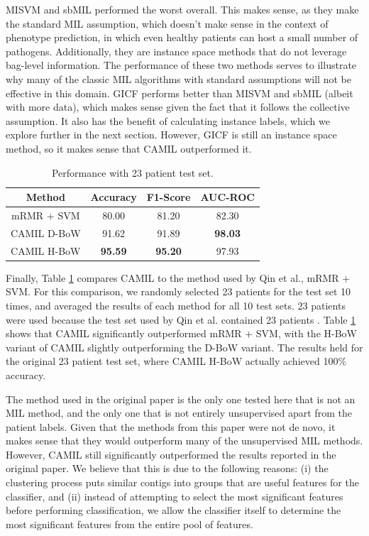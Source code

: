 MISVM and sbMIL performed the worst overall. This makes sense, as they make the standard MIL assumption, which doesn't make sense in the context of phenotype prediction, in which even healthy patients can host a small number of pathogens. Additionally, they are instance space methods that do not leverage bag-level information. The performance of these two methods serves to illustrate why many of the classic MIL algorithms with standard assumptions will not be effective in this domain. GICF performs better than MISVM and sbMIL (albeit with more data), which makes sense given the fact that it follows the collective assumption. It also has the benefit of calculating instance labels, which we explore further in the next section. However, GICF is still an instance space method, so it makes sense that CAMIL outperformed it.

\begin{table}[h]
\begin{center}
\caption{Performance with 23 patient test set.} 
\label{tab:test-comp}
\begin{tabular}{|c|ccc|}\hline
Method & Accuracy & F1-Score & AUC-ROC\\\hline
mRMR + SVM & 80.00 & 81.20 & 82.30\\\hline 
CAMIL D-BoW & 91.62 & 91.89 & \bf{98.03}\\\hline
CAMIL H-BoW & \bf{95.59} & \bf{95.20} & 97.93\\\hline
\end{tabular}
\end{center}
\end{table}

Finally, Table \ref{tab:test-comp} compares CAMIL to the method used by Qin et al., mRMR + SVM. For this comparison, we randomly selected 23 patients for the test set 10 times, and averaged the results of each method for all 10 test sets. 23 patients were used because the test set used by Qin et al. contained 23 patients \cite{qin041012}. Table \ref{tab:test-comp} shows that CAMIL significantly outperformed mRMR + SVM, with the H-BoW variant of CAMIL slightly outperforming the D-BoW variant. The results held for the original 23 patient test set, where CAMIL H-BoW actually achieved 100\% accuracy.

The method used in the original paper is the only one tested here that is not an MIL method, and the only one that is not entirely unsupervised apart from the patient labels. Given that the methods from this paper were not de novo, it makes sense that they would outperform many of the unsupervised MIL methods. However, CAMIL still significantly outperformed the results reported in the original paper. We believe that this is due to the following reasons: (i) the clustering process puts similar contigs into groups that are useful features for the classifier, and (ii) instead of attempting to select the most significant features before performing classification, we allow the classifier itself to determine the most significant features from the entire pool of features.

